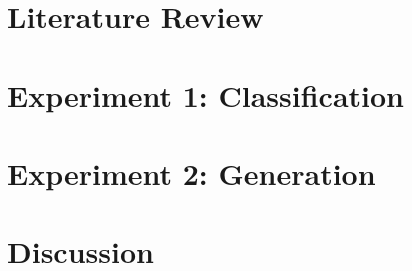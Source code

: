 \documentclass{report}
\begin{document}
\chapter{Literature Review}


\chapter{Experiment 1: Classification}








\chapter{Experiment 2: Generation}



% 





% 


% 


% 

% 

% 

\chapter{Discussion}
\end{document}
